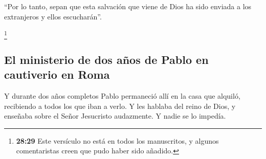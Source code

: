 ``Por lo tanto, sepan que esta salvación que viene de
Dios ha sido enviada a los extranjeros y ellos escucharán''.

 \footnote{\textbf{28:29} Este versículo no está en todos
  los manuscritos, y algunos comentaristas creen que pudo haber sido
  añadido.}

\hypertarget{el-ministerio-de-dos-auxf1os-de-pablo-en-cautiverio-en-roma}{%
\subsection{El ministerio de dos años de Pablo en cautiverio en
Roma}\label{el-ministerio-de-dos-auxf1os-de-pablo-en-cautiverio-en-roma}}

 Y durante dos años completos Pablo permaneció allí en la
casa que alquiló, recibiendo a todos los que iban a verlo.
 Y les hablaba del reino de Dios, y enseñaba sobre el
Señor Jesucristo audazmente. Y nadie se lo impedía.
